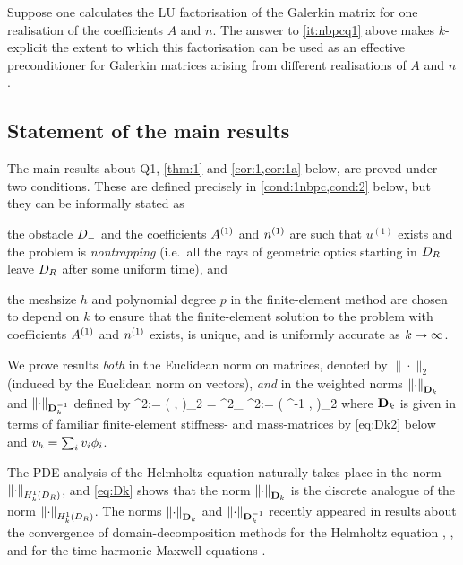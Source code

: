 
Suppose one calculates the LU factorisation of the Galerkin matrix for one realisation of the coefficients $A$ and $n$. The answer to \cref{it:nbpcq1} above makes $k$-explicit the extent to which this factorisation can be used as an effective preconditioner for Galerkin matrices arising from different realisations of $A$ and $n$.

\subsection{Statement of the main results}\label{sec:main}
The main results about Q1, \cref{thm:1} and \cref{cor:1,cor:1a} below, are proved under two conditions. These are defined precisely in \cref{cond:1nbpc,cond:2} below, but they can be informally stated as 
\bit
\item the obstacle $D_{-}$ and the coefficients ${A}^{(1)}$ and ${n}^{(1)}$ are such that $u^{(1)}$ exists and the problem is \emph{nontrapping} (i.e.~all the rays of geometric optics starting in $D_{R}$ leave $D_{R}$ after some uniform time), and
\item the meshsize $h$ and polynomial degree $p$ in the finite-element method are chosen to depend on $k$ to ensure that the 
finite-element solution to the problem with coefficients ${A}^{(1)}$ and ${n}^{(1)}$ exists, is unique, and 
is uniformly accurate as $k\rightarrow \infty$. 
\eit 

We prove results \emph{both} in the Euclidean norm on matrices, denoted by $\|\cdot\|_2$ (induced by the Euclidean norm on vectors), \emph{and} in the weighted norms $\NDmatk{\cdot}$ and $\NDmatkI{\cdot}$ defined by 
\beq\label{eq:Dk}
\NDmatk{\bv}^2:= \big( \Dmatk \bv, \bv\big)_2 = %
^2_{\HokDR}
\quad \tand
\quad \NDmatkI{\bv}^2:= \big( \Dmatk^{-1} \bv, \bv\big)_2 %
\eeq
where $\mathbf{D}_{k}$ is given in terms of familiar finite-element stiffness- and mass-matrices by \cref{eq:Dk2} below and $v_{h} =\sum_i v_{i} \phi_{i}$.

The PDE analysis of the Helmholtz equation naturally takes place in the norm $\NHokDR{\cdot}$, and \cref{eq:Dk} shows that the norm $\NDmatk{\cdot}$ is
the discrete analogue of the norm $\NHokDR{\cdot}$. %
The norms $\NDmatk{\cdot}$ and $\NDmatkI{\cdot}$ recently appeared in results about the convergence of domain-decomposition methods %
for the Helmholtz equation \cite{GrSpVa:17}, \cite{GrSpZo:18}, and for the time-harmonic Maxwell equations \cite{BoDoGrSpTo:19}. 

